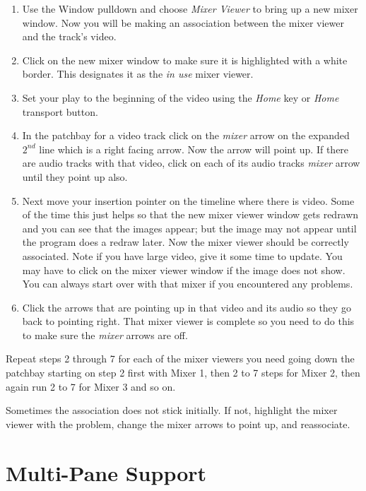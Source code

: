 \begin{enumerate}[resume]
	\item Use the Window pulldown and choose \textit{Mixer Viewer} to bring up a new mixer window.  Now you will be making an association between the mixer viewer and the track’s video.
    \item Click on the new mixer window to make sure it is highlighted with a white border. This designates it as the \textit{in use} mixer viewer.
    \item Set your play to the beginning of the video using the \textit{Home} key or \textit{Home} transport button.
    \item In the patchbay for a video track click on the \textit{mixer} arrow on the expanded $2^{nd}$ line which is a right facing arrow.  Now the arrow will point up.  If there are audio tracks with that video, click on each of its audio tracks \textit{mixer} arrow until they point up also.
    \item Next move your insertion pointer on the timeline where there is video.  Some of the time this just helps so that the new mixer viewer window gets redrawn and you can see that the images appear; but the image may not appear until the program does a redraw later.  Now the mixer viewer should be
    correctly associated.  Note if you have large video, give it some time to update.  You may have to click on the mixer viewer window if the image does not show.  You can always start over with that mixer if you encountered any problems.
    \item Click the arrows that are pointing up in that video and its audio so they go back to pointing right. That mixer viewer is complete so you need to do this to make sure the \textit{mixer} arrows are off.
\end{enumerate}

Repeat steps 2 through 7 for each of the mixer viewers you need going down the patchbay starting on step 2 first with Mixer 1, then 2 to 7 steps for Mixer 2, then again run 2 to 7 for Mixer 3 and so on.

Sometimes the association does not stick initially.  If not, highlight the mixer viewer with the problem, change the mixer arrows to point up, and reassociate.

\section{Multi-Pane Support}%
\label{sec:multipane_support}

